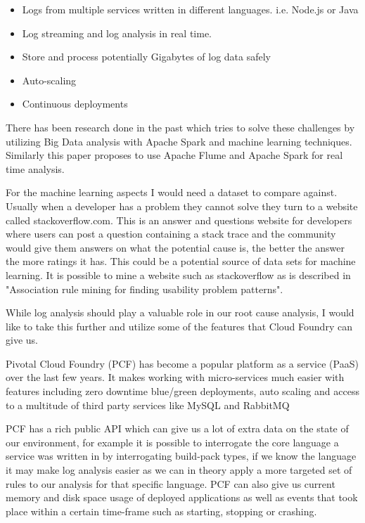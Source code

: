 \begin{itemize}
  \item Logs from multiple services written in different languages. i.e. Node.js or Java
  \item Log streaming and log analysis in real time. 
  \item Store and process potentially Gigabytes of log data safely
  \item Auto-scaling
  \item Continuous deployments
\end{itemize}

There has been research done in the past which tries to solve these challenges by utilizing Big Data analysis with Apache Spark and machine learning techniques\cite{8067504}. Similarly this paper\cite{7748933} proposes to use Apache Flume and Apache Spark for real time analysis.

For the machine learning aspects I would need a dataset to compare against. Usually when a developer has a problem they cannot solve they turn to a website called stackoverflow.com. This is an answer and questions website for developers where users can post a question containing a stack trace and the community would give them answers on what the potential cause is, the better the answer the more ratings it has. This could be a potential source of data sets for machine learning. It is possible to mine a website such as stackoverflow as is described in "Association rule mining for finding usability problem patterns"\cite{8320144}.

While log analysis should play a valuable role in our root cause analysis, I would like to take this further and utilize some of the features that Cloud Foundry can give us.

Pivotal Cloud Foundry (PCF) has become a popular platform as a service (PaaS) over the last few years\cite{6924673}. It makes working with micro-services much easier with features including zero downtime blue/green deployments, auto scaling and access to a multitude of third party services like MySQL and RabbitMQ

PCF has a rich public API which can give us a lot of extra data on the state of our environment, for example it is possible to interrogate the core language a service was written in by interrogating build-pack types, if we know the language it may make log analysis easier as we can in theory apply a more targeted set of rules to our analysis for that specific language. PCF can also give us current memory and disk space usage of deployed applications as well as events that took place within a certain time-frame such as starting, stopping or crashing.